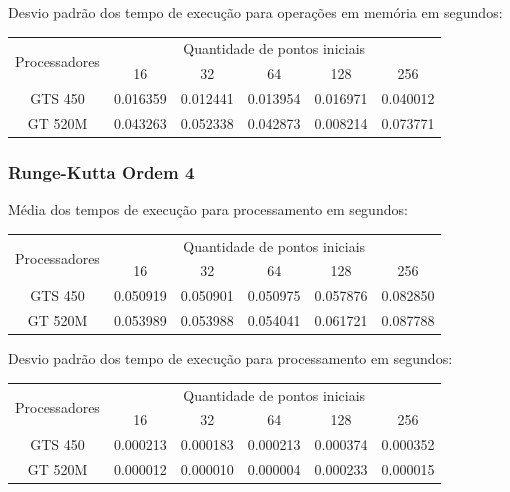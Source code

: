     \hspace{1mm}\newline
    
    \noindent Desvio padrão dos tempo de execução para operações em memória em segundos:\\
    \begin{tabular}{| c | c | c | c | c | c |}
      \hline
      \multirow{2}{*}{Processadores}& \multicolumn{5}{|c|}{Quantidade de pontos iniciais} \\ \cline{2-6}
      & 16 & 32 & 64 & 128 & 256 \\ \hline
      GTS 450 & 0.016359 & 0.012441 & 0.013954 & 0.016971 & 0.040012 \\ \hline
      GT 520M & 0.043263 & 0.052338 & 0.042873 & 0.008214 & 0.073771 \\ \hline

      \hline
    \end{tabular}
    
    \subsubsection{Runge-Kutta Ordem 4} 
    Média dos tempos de execução para processamento em segundos:\\
    \begin{tabular}{| c | c | c | c | c | c |}
      \hline
      \multirow{2}{*}{Processadores}& \multicolumn{5}{|c|}{Quantidade de pontos iniciais} \\ \cline{2-6}
      & 16 & 32 & 64 & 128 & 256 \\ \hline
      GTS 450 & 0.050919 & 0.050901 & 0.050975 & 0.057876 & 0.082850\\ \hline
      GT 520M & 0.053989 & 0.053988 & 0.054041 & 0.061721 & 0.087788\\ \hline

      \hline
    \end{tabular}
    
    \hspace{1mm}\newline
    
    \noindent Desvio padrão dos tempo de execução para processamento em segundos:\\
    \begin{tabular}{| c | c | c | c | c | c |}
      \hline
      \multirow{2}{*}{Processadores}& \multicolumn{5}{|c|}{Quantidade de pontos iniciais} \\ \cline{2-6}
      & 16 & 32 & 64 & 128 & 256 \\ \hline
      GTS 450 & 0.000213 & 0.000183 & 0.000213 & 0.000374 & 0.000352 \\ \hline
      GT 520M & 0.000012 & 0.000010 & 0.000004 & 0.000233 & 0.000015 \\ \hline

      \hline
    \end{tabular}
    
